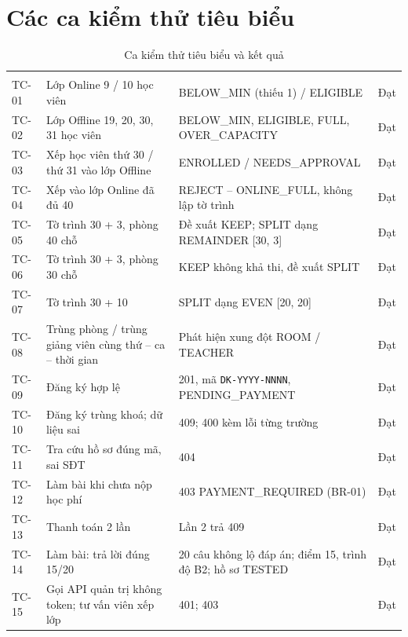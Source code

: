\section{Các ca kiểm thử tiêu biểu}
\begin{xltabular}{\linewidth}{|l|L{5.4cm}|Y|c|}
  \caption{Ca kiểm thử tiêu biểu và kết quả}\label{tab:tc}\\ \hline
  \headrow {} &  &  &  \\ \hline
  \endfirsthead \hline
  \headrow {} &  &  &  \\ \hline
  \endhead
  TC-01 & Lớp Online 9 / 10 học viên & BELOW\_MIN (thiếu 1) / ELIGIBLE & Đạt \\ \hline
  TC-02 & Lớp Offline 19, 20, 30, 31 học viên & BELOW\_MIN, ELIGIBLE, FULL, OVER\_CAPACITY & Đạt \\ \hline
  TC-03 & Xếp học viên thứ 30 / thứ 31 vào lớp Offline & ENROLLED / NEEDS\_APPROVAL & Đạt \\ \hline
  TC-04 & Xếp vào lớp Online đã đủ 40 & REJECT – ONLINE\_FULL, không lập tờ trình & Đạt \\ \hline
  TC-05 & Tờ trình 30 + 3, phòng 40 chỗ & Đề xuất KEEP; SPLIT dạng REMAINDER [30, 3] & Đạt \\ \hline
  TC-06 & Tờ trình 30 + 3, phòng 30 chỗ & KEEP không khả thi, đề xuất SPLIT & Đạt \\ \hline
  TC-07 & Tờ trình 30 + 10 & SPLIT dạng EVEN [20, 20] & Đạt \\ \hline
  TC-08 & Trùng phòng / trùng giảng viên cùng thứ – ca – thời gian & Phát hiện xung đột ROOM / TEACHER & Đạt \\ \hline
  TC-09 & Đăng ký hợp lệ & 201, mã \texttt{DK-YYYY-NNNN}, PENDING\_PAYMENT & Đạt \\ \hline
  TC-10 & Đăng ký trùng khoá; dữ liệu sai & 409; 400 kèm lỗi từng trường & Đạt \\ \hline
  TC-11 & Tra cứu hồ sơ đúng mã, sai SĐT & 404 & Đạt \\ \hline
  TC-12 & Làm bài khi chưa nộp học phí & 403 PAYMENT\_REQUIRED (BR-01) & Đạt \\ \hline
  TC-13 & Thanh toán 2 lần & Lần 2 trả 409 & Đạt \\ \hline
  TC-14 & Làm bài: trả lời đúng 15/20 & 20 câu không lộ đáp án; điểm 15, trình độ B2; hồ sơ TESTED & Đạt \\ \hline
  TC-15 & Gọi API quản trị không token; tư vấn viên xếp lớp & 401; 403 & Đạt \\ \hline

\end{xltabular}

